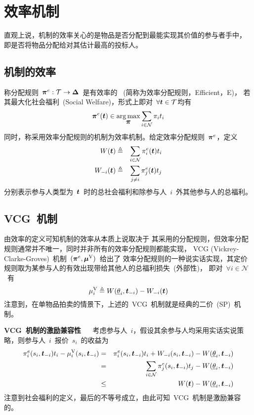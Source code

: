 \documentclass[a4paper,12pt]{article}
\newcommand{\mv}[1]{\mbox{\boldmath$#1$}}         %
\begin{document}
\section{效率机制}

直观上说，机制的效率关心的是物品是否分配到最能实现其价值的参与者手中，
即是否将物品分配给对其估计最高的投标人。


\subsection{机制的效率}

称分配规则~$\mv{\pi}^e:\mathcal{T}\rightarrow\mv{\Delta}$~是有效率的
~(简称为效率分配规则，Efficient，E)，
若其最大化社会福利~(Social Welfare)，形式上即对~$\forall\mv{t}
\in\mathcal{T}$均有
\begin{equation}
    \mv{\pi}^e(\mv{t})\in\mathop{\arg\max}\limits_{\mv{\pi}} 
         \sum_{i\in\mathcal{N}}\pi_it_i
\end{equation}
同时，称采用效率分配规则的机制为效率机制。给定效率分配规则~$\mv{\pi}^e$，定义
\begin{eqnarray}
    W(\mv{t}) &\triangleq& \sum_{i\in\mathcal{N}} \pi^e_i(\mv{t})t_i \\
    W_{-i}(\mv{t}) &\triangleq& \sum_{j\neq i} \pi^e_j(\mv{t})t_j
\end{eqnarray}
分别表示参与人类型为~$\mv{t}$~时的总社会福利和除参与人~$i$~外其他参与人的总福利。

\subsection{VCG~机制} 

由效率的定义可知机制的效率从本质上说取决于
其采用的分配规则，但效率分配规则通常并不唯一，同时并非所有的效率分配规则都能实现，
VCG (Vickrey-Clarke-Groves)~机制~$(\mv{\pi}^e, \mv{\mu}^{\mathrm{V}})$~给出了
效率分配规则的一种说实话实现，其定价规则取为某参与人的有效出现带给其他人的总福利损失~(外部性)，
即对~$\forall i\in\mathcal{N}$~有
\begin{equation}
    \mu^{\mathrm{V}}_i \triangleq W(\underline{\theta}_i, \mv{t}_{-i}) - W_{-i}(\mv{t})
\end{equation}
注意到，在单物品拍卖的情景下，上述的~VCG~机制就是经典的二价~(SP)~机制。

\textbf{VCG~机制的激励兼容性}~ ~
考虑参与人~$i$，假设其余参与人均采用实话实说策略，则参与人~$i$~报价~$s_i$~的收益为
\begin{eqnarray*}
    \pi^e_i(s_i,\mv{t}_{-i})t_i - \mu_i^{\mathrm{V}}(s_i,\mv{t}_{-i}) 
         &=& \pi^e_i(s_i,\mv{t}_{-i})t_i + W_{-i}(s_i,\mv{t}_{-i}) - W(\underline{\theta}_i,\mv{t}_{-i}) \\
	 &=& \sum_{i\in\mathcal{N}} \pi^e_j(s_i,\mv{t}_{-i})t_j - W(\underline{\theta}_i,\mv{t}_{-i}) \\
	 &\le& W(\mv{t}) - W(\underline{\theta}_i,\mv{t}_{-i})
\end{eqnarray*}
注意到社会福利的定义，最后的不等号成立，由此可知~VCG~机制是激励兼容的。
\end{document}
